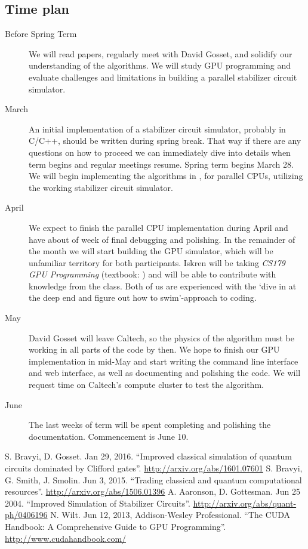 \documentclass[11pt]{article}
\begin{document}
\begin{multicols}{2}
\subsection*{Time plan}
\begin{description}
    \item[Before Spring Term] We will read papers, regularly meet with David Gosset, and solidify our understanding of the algorithms. We will study GPU programming and evaluate challenges and limitations in building a parallel stabilizer circuit simulator.
    \item[March] An initial implementation of a stabilizer circuit simulator, probably in C/C++, should be written during spring break. That way if there are any questions on how to proceed we can immediately dive into details when term begins and regular meetings resume. Spring term begins March 28. We will begin implementing the algorithms in \cite{bravyi-gosset}, for parallel CPUs, utilizing the working stabilizer circuit simulator.
    \item[April] We expect to finish the parallel CPU implementation during April and have about of week of final debugging and polishing. In the remainder of the month we will start building the GPU simulator, which will be unfamiliar territory for both participants. Iskren will be taking \textit{CS179 GPU Programming} (textbook: \cite{cudahandbook}) and will be able to contribute with knowledge from the class. Both of us are experienced with the `dive in at the deep end and figure out how to swim'-approach to coding.
    \item[May] David Gosset will leave Caltech, so the physics of the algorithm must be working in all parts of the code by then. We hope to finish our GPU implementation in mid-May and start writing the command line interface and web interface, as well as documenting and polishing the code. We will request time on Caltech's compute cluster to test the algorithm. 
    \item[June] The last weeks of term will be spent completing and polishing the documentation. Commencement is June 10.

\end{description}

\end{multicols}



\begin{thebibliography}{2}
     S. Bravyi, D. Gosset. Jan 29, 2016. ``Improved classical simulation of quantum circuits dominated by Clifford gates''. \url{http://arxiv.org/abs/1601.07601}
     S. Bravyi, G. Smith, J. Smolin. Jun 3, 2015. ``Trading classical and quantum computational resources''. \url{http://arxiv.org/abs/1506.01396}
     A. Aaronson, D. Gottesman. Jun 25 2004. ``Improved Simulation of Stabilizer Circuits''. \url{http://arxiv.org/abs/quant-ph/0406196}
     N. Wilt. Jun 12, 2013, Addison-Wesley Professional. ``The CUDA Handbook: A Comprehensive Guide to GPU Programming''. \url{http://www.cudahandbook.com/}
\end{thebibliography}
\end{document}
